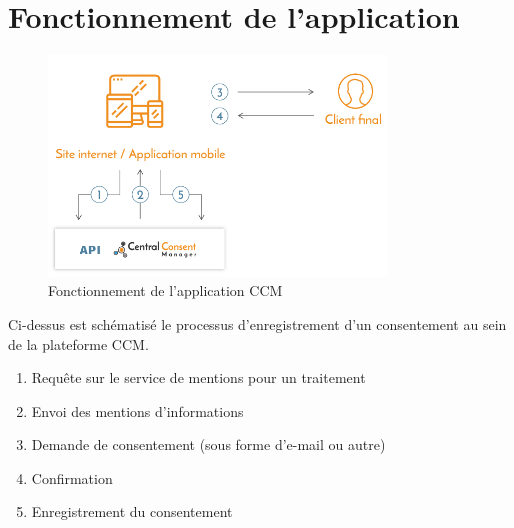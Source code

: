 \documentclass[12pt, a4paper]{report}
\begin{document}
\section{Fonctionnement de l'application}
\begin{figure}[H]
    \begin{center}
        \includegraphics[width=0.8\textwidth]{ccm5.png}
    \end{center}
    \caption{Fonctionnement de l'application CCM}
\end{figure}
Ci-dessus est schématisé le processus d’enregistrement d’un consentement au sein de la plateforme CCM.
\begin{enumerate}
    \item Requête sur le service de mentions pour un traitement
    \item Envoi des mentions d'informations
    \item Demande de consentement (sous forme d'e-mail ou autre)
    \item Confirmation
    \item Enregistrement du consentement
\end{enumerate}
\end{document}
